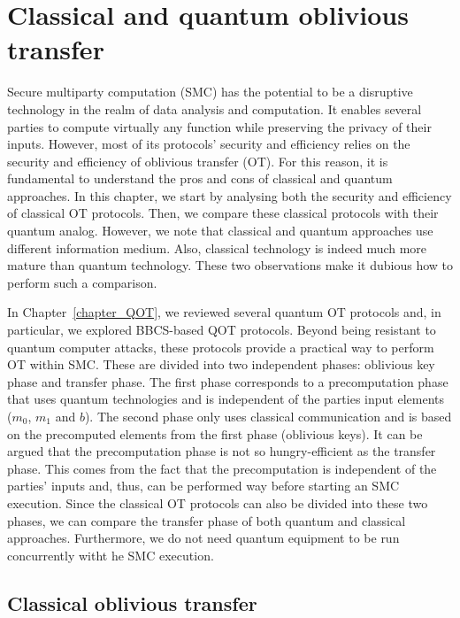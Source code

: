 


%

\chapter{Classical and quantum oblivious transfer}

Secure multiparty computation (SMC) has the potential to be a disruptive technology in the realm of data analysis and computation. It enables several parties to compute virtually any function while preserving the privacy of their inputs. However, most of its protocols’ security and efficiency relies on the security and efficiency of oblivious transfer (OT). For this reason, it is fundamental to understand the pros and cons of classical and quantum approaches. In this chapter, we start by analysing both the security and efficiency of classical OT protocols. Then, we compare these classical protocols with their quantum analog. However, we note that classical and quantum approaches use different information medium. Also, classical technology is indeed much more mature than quantum technology. These two observations make it dubious how to perform such a comparison. 

In Chapter~\ref{chapter_QOT}, we reviewed several quantum OT protocols and, in particular, we explored BBCS-based QOT protocols. Beyond being resistant to quantum computer attacks, these protocols provide a practical way to perform OT within SMC. These are divided into two independent phases: oblivious key phase and transfer phase. The first phase corresponds to a precomputation phase that uses quantum technologies and is independent of the parties input elements ($m_0$, $m_1$ and $b$). The second phase only uses classical communication and is based on the precomputed elements from the first phase (oblivious keys). It can be argued that the precomputation phase is not so hungry-efficient as the transfer phase. This comes from the fact that the precomputation is independent of the parties' inputs and, thus, can be performed way before starting an SMC execution. Since the classical OT protocols can also be divided into these two phases, we can compare the transfer phase of both quantum and classical approaches. Furthermore, we do not need quantum equipment to be run concurrently witht he SMC execution.


\section{Classical oblivious transfer}\label{Classical-OT}


